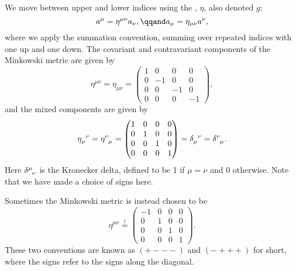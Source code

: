 \documentclass[fleqn]{NotesClass}
\newcommand{\minkowskiMetric}{\eta}
\begin{document}
\begin{appendices}
        We move between upper and lower indices using the , \(\minkowskiMetric\), also denoted \(g\):
        \begin{equation}
            a^\mu = \minkowskiMetric^{\mu\nu}a_\nu, \qqand a_\mu = \minkowskiMetric_{\mu\nu}a^\nu,
        \end{equation}
        where we apply the summation convention, summing over repeated indices with one up and one down.
        The covariant and contravariant components of the Minkowski metric are given by
        \begin{equation}
            \minkowskiMetric^{\mu\nu} = \minkowskiMetric_{\mu\nu} = 
            \begin{pmatrix}
                1 & 0 & 0 & 0\\
                0 & -1 & 0 & 0\\
                0 & 0 & -1 & 0\\
                0 & 0 & 0 & -1
            \end{pmatrix}
            ,
        \end{equation}
        and the mixed components are given by
        \begin{equation}
            \tensor{\minkowskiMetric}{_\mu^\nu} = \tensor{\minkowskiMetric}{^\nu_\mu} = 
            \begin{pmatrix}
                1 & 0 & 0 & 0\\
                0 & 1 & 0 & 0\\
                0 & 0 & 1 & 0\\
                0 & 0 & 0 & 1
            \end{pmatrix}
            = \tensor{\delta}{_\mu^\nu} = \tensor{\delta}{^\nu_\mu}.
        \end{equation}
        Here \(\tensor{\delta}{^\mu_\nu}\) is the Kronecker delta, defined to be 1 if \(\mu = \nu\) and 0 otherwise.
        Note that we have made a choice of signs here.
        \begin{wrn}
            Sometimes the Minkowski metric is instead chosen to be
            \begin{equation}
                \minkowskiMetric^{\mu\nu} \stackrel{!}{=} 
                \begin{pmatrix}
                    -1 & 0 & 0 & 0\\
                    0 & 1 & 0 & 0\\
                    0 & 0 & 1 & 0\\
                    0 & 0 & 0 & 1
                \end{pmatrix}
                .
            \end{equation}
            These two conventions are known as \(({+}{-}{-}{-})\) and \(({-}{+}{+}{+})\) for short, where the signs refer to the signs along the diagonal.
        \end{wrn}
        

\end{appendices}
\end{document}
